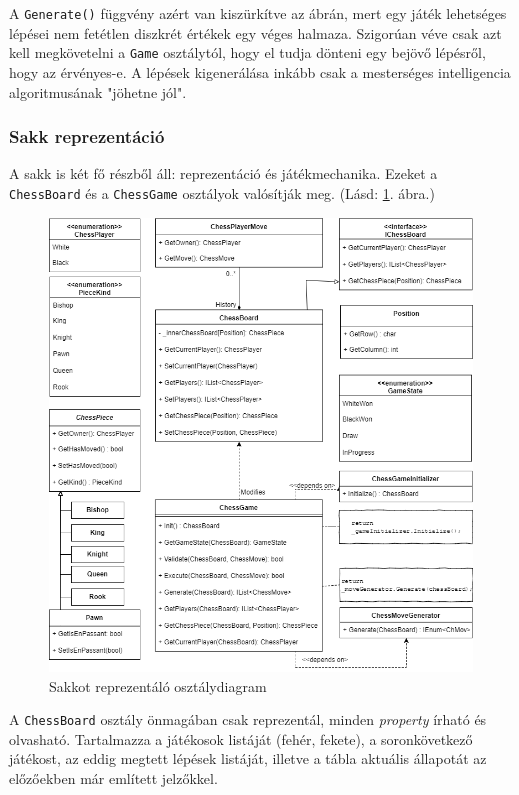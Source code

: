 \documentclass[twoside, a4paper, 12pt]{article}
\begin{document}
A \texttt{Generate()} függvény azért van kiszürkítve az ábrán, mert egy játék lehetséges lépései nem fetétlen diszkrét értékek egy véges halmaza. Szigorúan véve csak azt kell megkövetelni a \texttt{Game} osztálytól, hogy el tudja dönteni egy bejövő lépésről, hogy az érvényes-e. A lépések kigenerálása inkább csak a mesterséges intelligencia algoritmusának "jöhetne jól".

\subsubsection{Sakk reprezentáció}

A sakk is két fő részből áll: reprezentáció és játékmechanika. Ezeket a \texttt{ChessBoard} és a \texttt{ChessGame} osztályok valósítják meg. (Lásd: \ref{fig:chessClassDiagram}. ábra.)

\begin{figure}[htbp]
	\centering
	\includegraphics[width=\textwidth]{img/chessClassDiagram.png}
	\caption{Sakkot reprezentáló osztálydiagram}
	\label{fig:chessClassDiagram}
\end{figure}

A \texttt{ChessBoard} osztály önmagában csak reprezentál, minden \textit{property} írható és olvasható. Tartalmazza a játékosok listáját (fehér, fekete), a soronkövetkező játékost, az eddig megtett lépések listáját, illetve a tábla aktuális állapotát az előzőekben már említett jelzőkkel.
\end{document}
